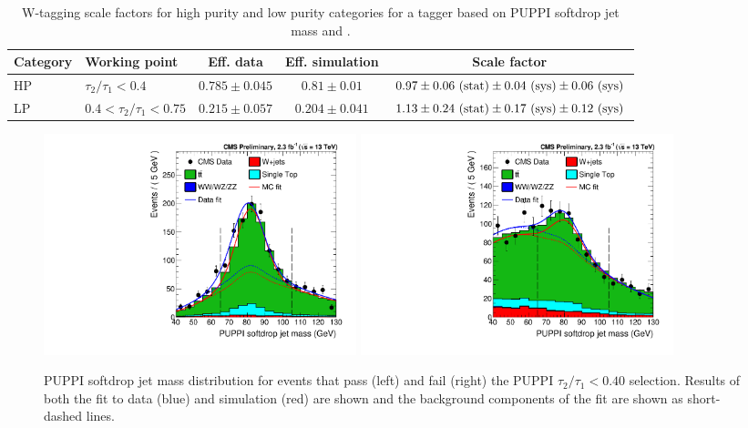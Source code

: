 \begin{table}[h!]
   \centering
   \footnotesize
   \begin{tabular}{|l|l|c|c|c|}
   \hline
   Category & Working point & Eff. data & Eff. simulation & Scale factor\\
   \hline
   HP& $\tau_2 / \tau_1 < 0.4$         & $0.785 \pm 0.045 $& $0.81 \pm 0.01$   &$0.97 \pm 0.06~\rm{(stat)} \pm 0.04~\rm{(sys)} \pm 0.06~\rm{(sys)}$\\
   LP& $0.4 < \tau_2 / \tau_1 < 0.75$ & $0.215 \pm 0.057 $& $0.204 \pm 0.041$ &$1.13 \pm 0.24~\rm{(stat)} \pm 0.17~\rm{(sys)}  \pm 0.12~\rm{(sys)}$\\
   \hline
   \end{tabular}
   \caption{W-tagging scale factors for high purity and low purity categories for a tagger based on PUPPI softdrop jet mass and  \nsubj. }
   \label{tab:app:WtagSFs}
\end{table}
\begin{figure}[h!]
\centering
\includegraphics[width=0.44\textwidth]{figures/vtagging/AN-16-215/_HP0v40powheg_76X_PuppiSD_em_pTbin_200_5000.pdf}
\includegraphics[width=0.44\textwidth]{figures/vtagging/AN-16-215/_HP0v40powheg_76X_PuppiSD_em_fail_pTbin_200_5000.pdf}\\
\caption{PUPPI softdrop jet mass distribution for events that pass (left) and fail (right) the PUPPI $\tau_2 / \tau_1 < 0.40$ selection. Results of both the fit to data (blue) and simulation (red) are shown and the background components of the fit are shown as short-dashed lines.}
\label{fig:appI:simfit}
\end{figure}

